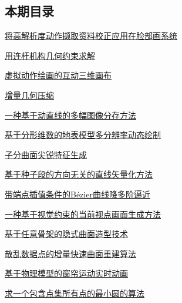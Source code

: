 \documentclass[a4paper]{article}
\begin{document}
\subsection{本期目录}
\href{http://www.jos.org.cn/ch/reader/download_pdf.aspx?file_no=20000903&year_id=2000&quarter_id=9&falg=1}{将高解析度动作撷取资料校正应用在脸部画系统}

\href{http://www.jos.org.cn/ch/reader/download_pdf.aspx?file_no=20000904&year_id=2000&quarter_id=9&falg=1}{用连杆机构几何约束求解}

\href{http://www.jos.org.cn/ch/reader/download_pdf.aspx?file_no=20000905&year_id=2000&quarter_id=9&falg=1}{虚拟动作绘画的互动三维画布}

\href{http://www.jos.org.cn/ch/reader/download_pdf.aspx?file_no=20000906&year_id=2000&quarter_id=9&falg=1}{增量几何压缩}

\href{http://www.jos.org.cn/ch/reader/download_pdf.aspx?file_no=20000907&year_id=2000&quarter_id=9&falg=1}{一种基于动直线的多幅图像分存方法}

\href{http://www.jos.org.cn/ch/reader/download_pdf.aspx?file_no=20000908&year_id=2000&quarter_id=9&falg=1}{基于分形维数的地表模型多分辨率动态绘制}

\href{http://www.jos.org.cn/ch/reader/download_pdf.aspx?file_no=20000909&year_id=2000&quarter_id=9&falg=1}{子分曲面尖锐特征生成}

\href{http://www.jos.org.cn/ch/reader/download_pdf.aspx?file_no=20000910&year_id=2000&quarter_id=9&falg=1}{基于种子段的方向无关的直线矢量化方法}

\href{http://www.jos.org.cn/ch/reader/download_pdf.aspx?file_no=20000911&year_id=2000&quarter_id=9&falg=1}{带端点插值条件的Bézier曲线降多阶逼近}

\href{http://www.jos.org.cn/ch/reader/download_pdf.aspx?file_no=20000912&year_id=2000&quarter_id=9&falg=1}{一种基于视觉约束的当前视点画面生成方法}

\href{http://www.jos.org.cn/ch/reader/download_pdf.aspx?file_no=20000913&year_id=2000&quarter_id=9&falg=1}{基于任意骨架的隐式曲面造型技术}

\href{http://www.jos.org.cn/ch/reader/download_pdf.aspx?file_no=20000914&year_id=2000&quarter_id=9&falg=1}{散乱数据点的增量快速曲面重建算法}

\href{http://www.jos.org.cn/ch/reader/download_pdf.aspx?file_no=20000915&year_id=2000&quarter_id=9&falg=1}{基于物理模型的窗帘运动实时动画}

\href{http://www.jos.org.cn/ch/reader/download_pdf.aspx?file_no=20000916&year_id=2000&quarter_id=9&falg=1}{求一个包含点集所有点的最小圆的算法}
\end{document}
